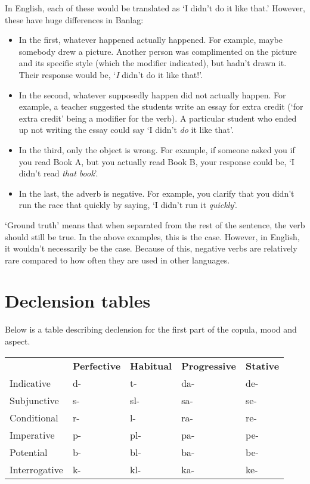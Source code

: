 \documentclass[12pt]{report}
\begin{document}
In English, each of these would be translated as `I didn't do it like that.' However, these have huge differences in Banlag:

\begin{itemize}
\item In the first, whatever happened actually happened. For example, maybe somebody drew a picture. Another person was complimented on the picture and its specific style (which the modifier indicated), but hadn't drawn it. Their response would be, `\textit{I} didn't do it like that!'.
\item In the second, whatever supposedly happen did not actually happen. For example, a teacher suggested the students write an essay for extra credit (`for extra credit' being a modifier for the verb). A particular student who ended up not writing the essay could say `I didn't \textit{do} it like that'.
\item In the third, only the object is wrong. For example, if someone asked you if you read Book A, but you actually read Book B, your response could be, `I didn't read \textit{that book}'.
\item In the last, the adverb is negative. For example, you clarify that you didn't run the race that quickly by saying, `I didn't run it \textit{quickly}'.
\end{itemize}

`Ground truth' means that when separated from the rest of the sentence, the verb should still be true. In the above examples, this is the case. However, in English, it wouldn't necessarily be the case. Because of this, negative verbs are relatively rare compared to how often they are used in other languages.

\section{Declension tables}
Below is a table describing declension for the first part of the copula, mood and aspect.

\vspace{5mm}
\begin{tabular}{l | l | l | l | l}
  & \textbf{Perfective} &  \textbf{Habitual} & \textbf{Progressive} & \textbf{Stative}\\
Indicative & d- & t-& da-& de-  \\
Subjunctive  & s- &  sl- & sa- & se-  \\
Conditional &  r-& l- & ra- & re- \\
Imperative  & p- &  pl-& pa-& pe-  \\
Potential  & b-& bl-& ba- & be- \\
Interrogative & k- &  kl- & ka-&  ke-\\
\end{tabular}
\end{document}

